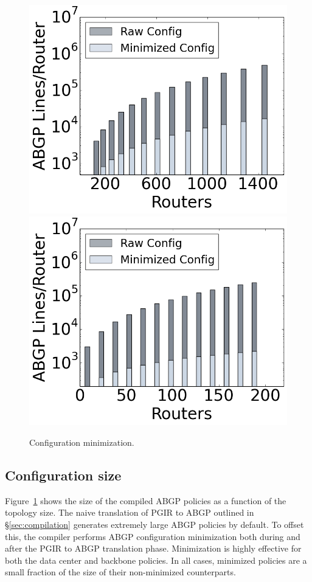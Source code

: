\documentclass[10pt]{sigalternate052015}
\begin{document}
%

\begin{figure}[t!]
    {\includegraphics[width=.49\columnwidth]{figures/config-compression-dc.png}}
    {\includegraphics[width=.49\columnwidth]{figures/config-compression-backbone.png}} \\
  \caption{Configuration minimization. \label{fig:config-min}}
  \vspace{-1em}
\end{figure}

\subsection{Configuration size}

Figure~\ref{fig:config-min} shows the size of the compiled ABGP policies as a function of the topology size. The naive translation of PGIR to ABGP outlined in \S\ref{sec:compilation} generates extremely large ABGP policies by default. To offset this, the compiler performs ABGP configuration minimization both during and after the PGIR to ABGP translation phase.
Minimization is highly effective for both the data center and backbone policies. In all cases, minimized policies are a small fraction of the size of their non-minimized counterparts. 
\end{document}
